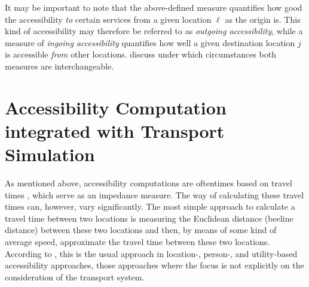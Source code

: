 

It may be important to note that the above-defined measure quantifies how good the accessibility \emph{to} certain
services from a given location $\ell$ as the origin is. This kind of accessibility may therefore be referred to 
as \emph{outgoing accessibility}, while a measure of \emph{ingoing accessibility} quantifies how well a given
destination location $j$ is accessible \emph{from} other locations. \citet{NicolaiNagelHiResAccessibilityMethod} 
discuss under which circumstances both measures are interchangeable.

\section{Accessibility Computation integrated with Transport Simulation}
\label{sec:integrated}
As mentioned above, accessibility computations are oftentimes based on travel times 
\citep{BBSRErreichbarkeitsmodell, BuettnerEtAl2010Erreichbarkeitsatlas}, which serve as an impedance measure.
The way of calculating these travel times can, however, vary significantly. 
The most simple approach to calculate a travel time between two locations is measuring the Euclidean distance 
(beeline distance) between these two locations and then, by means of some kind of average speed, approximate the 
travel time between these two locations. According to \citet{Geurs2004AccessibilityReview}, this is the usual 
approach in location-, person-, and utility-based accessibility approaches, \ie those approaches where the focus 
is not explicitly on the consideration of the transport system.

